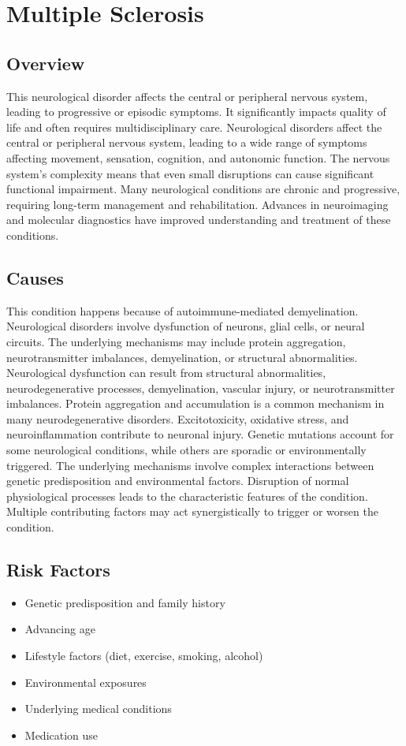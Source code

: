 \chapter{Multiple Sclerosis}
\label{sec:Multiple Sclerosis}

\section{Overview}
This neurological disorder affects the central or peripheral nervous system, leading to progressive or episodic symptoms. It significantly impacts quality of life and often requires multidisciplinary care. Neurological disorders affect the central or peripheral nervous system, leading to a wide range of symptoms affecting movement, sensation, cognition, and autonomic function. The nervous system's complexity means that even small disruptions can cause significant functional impairment. Many neurological conditions are chronic and progressive, requiring long-term management and rehabilitation. Advances in neuroimaging and molecular diagnostics have improved understanding and treatment of these conditions.
\section{Causes}
This condition happens because of autoimmune-mediated demyelination. Neurological disorders involve dysfunction of neurons, glial cells, or neural circuits. The underlying mechanisms may include protein aggregation, neurotransmitter imbalances, demyelination, or structural abnormalities. Neurological dysfunction can result from structural abnormalities, neurodegenerative processes, demyelination, vascular injury, or neurotransmitter imbalances. Protein aggregation and accumulation is a common mechanism in many neurodegenerative disorders. Excitotoxicity, oxidative stress, and neuroinflammation contribute to neuronal injury. Genetic mutations account for some neurological conditions, while others are sporadic or environmentally triggered. The underlying mechanisms involve complex interactions between genetic predisposition and environmental factors. Disruption of normal physiological processes leads to the characteristic features of the condition. Multiple contributing factors may act synergistically to trigger or worsen the condition.
\section{Risk Factors}
\begin{itemize}[noitemsep]
  \item Genetic predisposition and family history
  \item Advancing age
  \item Lifestyle factors (diet, exercise, smoking, alcohol)
  \item Environmental exposures
  \item Underlying medical conditions
  \item Medication use
\end{itemize}
